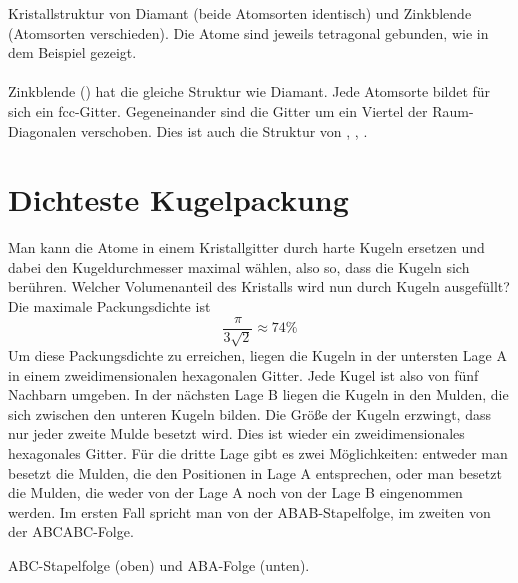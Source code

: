 \begin{marginfigure}

\caption{Kristallstruktur von  Diamant (beide Atomsorten identisch) und Zinkblende (Atomsorten verschieden). Die Atome sind jeweils tetragonal gebunden, wie in dem Beispiel gezeigt.}
\end{marginfigure}

\paragraph{} Zinkblende () hat die gleiche Struktur wie Diamant. Jede Atomsorte bildet für sich ein fcc-Gitter. Gegeneinander sind die Gitter um ein Viertel der Raum-Diagonalen verschoben. Dies ist auch die Struktur von , , .


\section{Dichteste Kugelpackung}

Man kann die Atome in einem Kristallgitter durch harte Kugeln ersetzen und dabei den Kugeldurchmesser maximal wählen, also so, dass die Kugeln sich berühren. Welcher Volumenanteil des Kristalls wird nun durch Kugeln ausgefüllt? Die maximale Packungsdichte ist 
\begin{equation}
 \frac{\pi}{3 \sqrt{2}} \approx 74 \%
\end{equation}
Um diese Packungsdichte zu erreichen, liegen die Kugeln in der untersten Lage A in einem zweidimensionalen hexagonalen Gitter. Jede Kugel ist also von fünf Nachbarn umgeben. In der nächsten Lage B liegen die Kugeln in den Mulden, die sich zwischen den unteren Kugeln bilden.  Die Größe der Kugeln erzwingt, dass nur jeder zweite Mulde besetzt wird.
Dies ist wieder ein zweidimensionales hexagonales Gitter. Für die dritte Lage gibt es zwei Möglichkeiten: entweder man besetzt die Mulden, die den Positionen in Lage A entsprechen, oder man besetzt die Mulden, die weder von der Lage A noch von der Lage B eingenommen werden. Im ersten Fall spricht man von der ABAB-Stapelfolge, im zweiten von der ABCABC-Folge.

\begin{marginfigure}

\caption{ABC-Stapelfolge (oben) und ABA-Folge (unten).}
\end{marginfigure}


